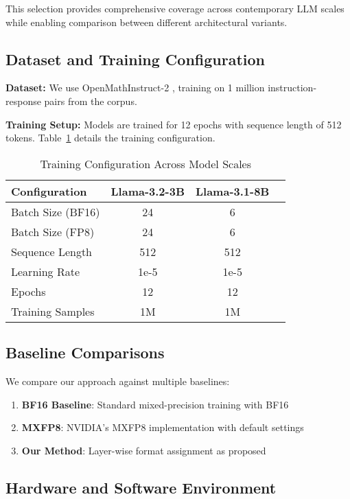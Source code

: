 \documentclass[conference]{IEEEtran}
\begin{document}
This selection provides comprehensive coverage across contemporary LLM scales while enabling comparison between different architectural variants.

\subsection{Dataset and Training Configuration}

\textbf{Dataset:} We use OpenMathInstruct-2 \cite{toshniwal2024openmath2}, training on 1 million instruction-response pairs from the corpus.

\textbf{Training Setup:} Models are trained for 12 epochs with sequence length of 512 tokens. Table~\ref{tab:training_config} details the training configuration.

\begin{table}[htbp]
\centering
\caption{Training Configuration Across Model Scales}
\begin{tabular}{@{}lccc@{}}
\toprule
\textbf{Configuration} & \textbf{Llama-3.2-3B} & \textbf{Llama-3.1-8B} \\
\midrule
Batch Size (BF16) & 24 & 6  \\
Batch Size (FP8) & 24 & 6  \\
Sequence Length & 512 & 512 \\
Learning Rate & 1e-5 & 1e-5 \\
Epochs & 12 & 12 \\
Training Samples & 1M & 1M\\
\bottomrule
\end{tabular}
\label{tab:training_config}
\end{table}

\subsection{Baseline Comparisons}

We compare our approach against multiple baselines:

\begin{enumerate}
\item \textbf{BF16 Baseline}: Standard mixed-precision training with BF16
\item \textbf{MXFP8}: NVIDIA's MXFP8 implementation with default settings
\item \textbf{Our Method}: Layer-wise format assignment as proposed
\end{enumerate}

\subsection{Hardware and Software Environment}
\end{document}
